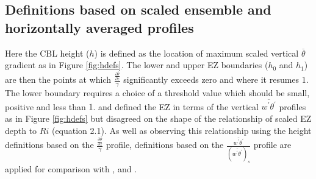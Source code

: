         

\subsection{Definitions based on scaled ensemble and horizontally averaged profiles}

Here the CBL height ($h$) is defined as the location of maximum scaled vertical $\overline{\theta}$ gradient as in Figure \ref{fig:hdefs}.  The lower and upper EZ boundaries ($h_{0}$ and $h_{1}$) are then the points at which $\frac{\frac{\partial \overline{\theta}}{\partial z}}{\gamma}$ significantly exceeds zero and where it resumes $1$.  The lower boundary requires a choice of a threshold value which should be small, positive and less than $1$. \cite{FedConzMir04} and \cite{BrooksFowler2} defined the EZ in terms of the vertical $\overline{w^{'}\theta^{'}}$ profiles as in Figure \ref{fig:hdefs} but disagreed on the shape of the relationship of scaled EZ depth to $Ri$ (equation 2.1).  As well as observing this relationship using the height definitions based on the $\frac{\frac{\partial \overline{\theta}}{\partial z}}{\gamma}$ profile, definitions based on the $\frac{\overline{w^{'}\theta^{'}}}{(\overline{w^{'}\theta^{'}})_{s}}$ profile are applied for comparison with \cite{BrooksFowler2}, \cite{FedConzMir04} and \cite{GarciaMellado}.\\  


